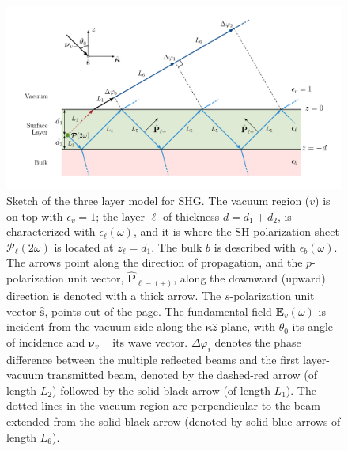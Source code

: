 \begin{figure}[t]
\centering 
\includegraphics[scale=0.5]{content/figures/diag-3layer_MR_2w}
\caption[Sketch of the three layer model for SHG.]
{Sketch of the three layer model for SHG. The vacuum region ($v$) is on top with
$\epsilon_{v}=1$; the layer $\ell$ of thickness $d = d_{1} + d_{2}$, is
characterized with $\epsilon_{\ell}(\omega)$, and it is where the SH
polarization sheet $\boldsymbol{\mathcal{P}}_{\ell}(2\omega)$ is located at
$z_{\ell} = d_{1}$. The bulk $b$ is described with $\epsilon_{b}(\omega)$. The
arrows point along the direction of propagation, and the $p$-polarization unit
vector, $\hat{\mathbf{P}}_{\ell -(+)}$, along the downward (upward) direction is
denoted with a thick arrow. The $s$-polarization unit vector $\hat{\mathbf{s}}$,
points out of the page. The fundamental field $\mathbf{E}_{v}(\omega)$ is
incident from the vacuum side along the $\boldsymbol{\kappa}\hat{z}$-plane, with
$\theta_{0}$ its angle of incidence and $\boldsymbol{\nu}_{v-}$ its wave vector.
$\Delta\varphi_{i}$ denotes the phase difference between the multiple reflected
beams and the first layer-vacuum transmitted beam, denoted by the dashed-red
arrow (of length $L_{2}$) followed by the solid black arrow (of length $L_{1}$).
The dotted lines in the vacuum region are perpendicular to the beam extended
from the solid black arrow (denoted by solid blue arrows of length $L_{6}$).}
\label{fig:MR3layer2w}
\end{figure}


